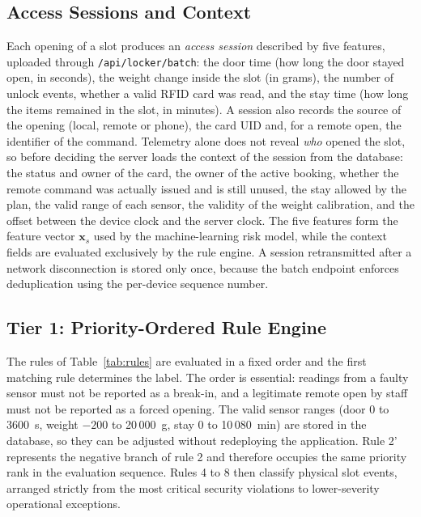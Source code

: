 \subsection{Access Sessions and Context}

Each opening of a slot produces an \emph{access session} described by five features, uploaded through
\texttt{/api/locker/batch}: the door time (how long the door stayed open, in seconds), the weight change inside the
slot (in grams), the number of unlock events, whether a valid RFID card was read, and the stay time (how long the items
remained in the slot, in minutes). A session also records the source of the opening (local, remote or phone), the card UID
and, for a remote open, the identifier of the command. Telemetry alone does not reveal \emph{who} opened the slot, so
before deciding the server loads the context of the session from the database: the status and owner of the card, the owner
of the active booking, whether the remote command was actually issued and is still unused, the stay allowed by the plan,
the valid range of each sensor, the validity of the weight calibration, and the offset between the device clock and
the server clock. The five features form the feature vector $\mathbf{x}_s$ used by the machine-learning risk model, while
the context fields are evaluated exclusively by the rule engine. A session retransmitted after a network disconnection is
stored only once, because the batch endpoint enforces deduplication using the per-device sequence number.

\subsection{Tier 1: Priority-Ordered Rule Engine}

The rules of Table~\ref{tab:rules} are evaluated in a fixed order and the first matching rule determines the label.
The order is essential: readings from a faulty sensor must not be reported as a break-in, and a legitimate remote open
by staff must not be reported as a forced opening. The valid sensor ranges (door 0 to 3600~s, weight $-200$ to
20\,000~g, stay 0 to 10\,080~min) are stored in the database, so they can be adjusted without redeploying the
application. Rule 2' represents the negative branch of rule 2 and therefore occupies the same priority rank in the
evaluation sequence. Rules 4 to 8 then classify physical slot events, arranged strictly from the most critical security
violations to lower-severity operational exceptions.

